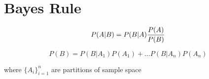\section{Bayes Rule}
\begin{slide}
\begin{shaded}
\begin{equation}
  P(A|B) = P(B|A){P(A) \over P(B)}
\end{equation}
\end{shaded}
\end{slide}
\begin{slide}
\vspace{-1cm}
\begin{shaded}
\begin{equation}
  P(B) = P(B|A_1)P(A_1)+\ldots P(B|A_n)P(A_n)
\end{equation}
\end{shaded}
where $\{A_i\}_{i=1}^n$ are partitions of sample space
\end{slide}


